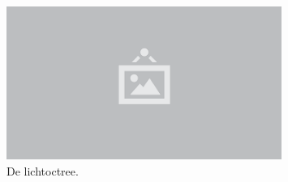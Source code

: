 \begin{figure}
  \centering
  \includegraphics[width=0.8\textwidth]{./img/raw/placeholder.png}
  \caption{De lichtoctree.}
  \label{fig:hs-licht-octree}
\end{figure}
